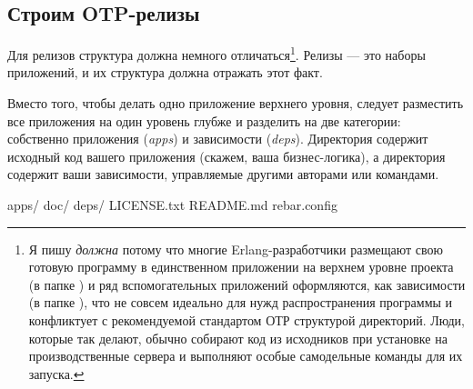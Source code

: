 \documentclass[11pt, oneside]{book}   	%
\begin{document}

\subsection{Строим OTP-релизы}
\label{subsec:building-otp-releases}

Для релизов структура должна немного отличаться\footnote{Я пишу \emph{должна} потому что многие Erlang-разработчики размещают свою готовую программу в единственном приложении на верхнем уровне проекта (в папке ) и ряд вспомогательных приложений оформляются, как зависимости (в папке ), что не совсем идеально для нужд распространения программы и конфликтует с рекомендуемой стандартом ОТР структурой директорий. Люди, которые так делают, обычно собирают код из исходников при установке на производственные сервера и выполняют особые самодельные команды для их запуска.}. Релизы --- это наборы приложений, и их структура должна отражать этот факт.

Вместо того, чтобы делать одно приложение верхнего уровня, следует разместить все приложения на один уровень глубже и разделить на две категории: собственно приложения (\emph{apps}) и зависимости (\emph{deps}). Директория  содержит исходный код вашего приложения (скажем, ваша бизнес-логика), а директория  содержит ваши зависимости, управляемые другими авторами или командами.

\begin{VerbatimRaw}
apps/
doc/
deps/
LICENSE.txt
README.md
rebar.config
\end{VerbatimRaw}
\end{document}

